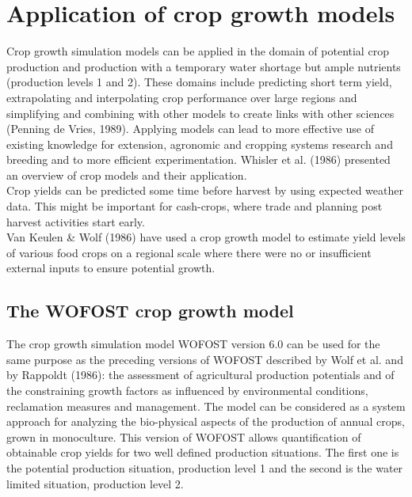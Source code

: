 \section{Application of crop growth models}
Crop growth simulation models can be applied in the domain of potential crop
production and production with a temporary water shortage but ample nutrients
(production levels 1 and 2). These domains include predicting short term yield,
extrapolating and interpolating crop performance over large regions and simplifying
and combining with other models to create links with other sciences (Penning de
Vries, 1989). Applying models can lead to more effective use of existing knowledge
for extension, agronomic and cropping systems research and breeding and to more
efficient experimentation. Whisler et al. (1986) presented an overview of crop models
and their application. \\
Crop yields can be predicted some time before harvest by using expected weather
data. This might be important for cash-crops, where trade and planning post harvest
activities start early.\\
Van Keulen \& Wolf (1986) have used a crop growth model to estimate yield levels of
various food crops on a regional scale where there were no or insufficient external
inputs to ensure potential growth.

\subsection{The WOFOST crop growth model}
The crop growth simulation model WOFOST version 6.0 can be used for the same
purpose as the preceding versions of WOFOST described by Wolf et al. and by
Rappoldt (1986): the assessment of agricultural production potentials and of the
constraining growth factors as influenced by environmental conditions, reclamation
measures and management. The model can be considered as a system approach for
analyzing the bio-physical aspects of the production of annual crops, grown in
monoculture. This version of WOFOST allows quantification of obtainable crop
yields for two well defined production situations. The first one is the potential
production situation, production level 1 and the second is the water limited situation,
production level 2.

